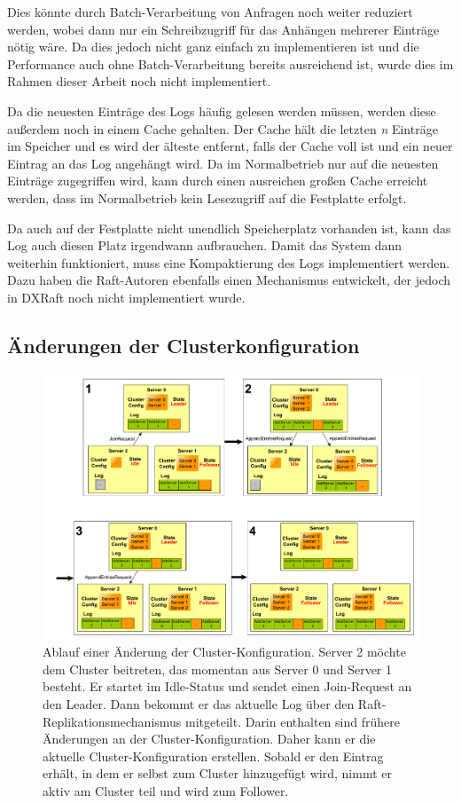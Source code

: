 Dies könnte durch Batch-Verarbeitung von Anfragen noch weiter reduziert werden, wobei dann nur ein Schreibzugriff für das Anhängen mehrerer Einträge nötig wäre. Da dies jedoch nicht ganz einfach zu implementieren ist und die Performance auch ohne Batch-Verarbeitung bereits ausreichend ist, wurde dies im Rahmen dieser Arbeit noch nicht implementiert.

Da die neuesten Einträge des Logs häufig gelesen werden müssen, werden diese außerdem noch in einem Cache gehalten. Der Cache hält die letzten \textit{n} Einträge im Speicher und es wird der älteste entfernt, falls der Cache voll ist und ein neuer Eintrag an das Log angehängt wird. Da im Normalbetrieb nur auf die neuesten Einträge zugegriffen wird, kann durch einen ausreichen großen Cache erreicht werden, dass im Normalbetrieb kein Lesezugriff auf die Festplatte erfolgt.

Da auch auf der Festplatte nicht unendlich Speicherplatz vorhanden ist, kann das Log auch diesen Platz irgendwann aufbrauchen. Damit das System dann weiterhin funktioniert, muss eine Kompaktierung des Logs implementiert werden. Dazu haben die Raft-Autoren ebenfalls einen Mechanismus entwickelt, der jedoch in DXRaft noch nicht implementiert wurde.

\subsection{Änderungen der Clusterkonfiguration}
\label{config-change}

\begin{figure}[p]
	\centering
	\includegraphics[width=\linewidth]{img/config-change.pdf}
	\caption{Ablauf einer Änderung der Cluster-Konfiguration. Server 2 möchte dem Cluster beitreten, das momentan aus Server 0 und Server 1 besteht. Er startet im Idle-Status und sendet einen Join-Request an den Leader. Dann bekommt er das aktuelle Log über den Raft-Replikationsmechanismus mitgeteilt. Darin enthalten sind frühere Änderungen an der Cluster-Konfiguration. Daher kann er die aktuelle Cluster-Konfiguration erstellen. Sobald er den Eintrag erhält, in dem er selbst zum Cluster hinzugefügt wird, nimmt er aktiv am Cluster teil und wird zum Follower.}
	\label{fig:config-change}
\end{figure}

